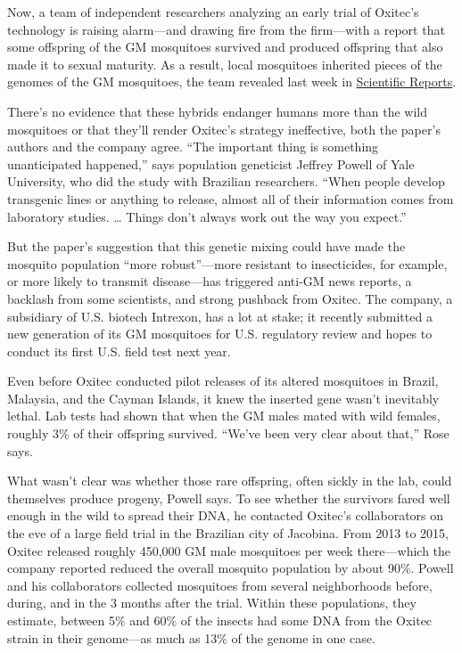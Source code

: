 \documentclass[
]{book}
\begin{document}
Now, a team of independent researchers analyzing an early trial of Oxitec's technology is raising alarm---and drawing fire from the firm---with a report that some offspring of the GM mosquitoes survived and produced offspring that also made it to sexual maturity. As a result, local mosquitoes inherited pieces of the genomes of the GM mosquitoes, the team revealed last week in \href{https://www.nature.com/articles/s41598-019-49660-6}{Scientific Reports}.

There's no evidence that these hybrids endanger humans more than the wild mosquitoes or that they'll render Oxitec's strategy ineffective, both the paper's authors and the company agree. ``The important thing is something unanticipated happened,'' says population geneticist Jeffrey Powell of Yale University, who did the study with Brazilian researchers. ``When people develop transgenic lines or anything to release, almost all of their information comes from laboratory studies. \ldots{} Things don't always work out the way you expect.''

But the paper's suggestion that this genetic mixing could have made the mosquito population ``more robust''---more resistant to insecticides, for example, or more likely to transmit disease---has triggered anti-GM news reports, a backlash from some scientists, and strong pushback from Oxitec. The company, a subsidiary of U.S. biotech Intrexon, has a lot at stake; it recently submitted a new generation of its GM mosquitoes for U.S. regulatory review and hopes to conduct its first U.S. field test next year.

Even before Oxitec conducted pilot releases of its altered mosquitoes in Brazil, Malaysia, and the Cayman Islands, it knew the inserted gene wasn't inevitably lethal. Lab tests had shown that when the GM males mated with wild females, roughly 3\% of their offspring survived. ``We've been very clear about that,'' Rose says.

What wasn't clear was whether those rare offspring, often sickly in the lab, could themselves produce progeny, Powell says. To see whether the survivors fared well enough in the wild to spread their DNA, he contacted Oxitec's collaborators on the eve of a large field trial in the Brazilian city of Jacobina. From 2013 to 2015, Oxitec released roughly 450,000 GM male mosquitoes per week there---which the company reported reduced the overall mosquito population by about 90\%. Powell and his collaborators collected mosquitoes from several neighborhoods before, during, and in the 3 months after the trial. Within these populations, they estimate, between 5\% and 60\% of the insects had some DNA from the Oxitec strain in their genome---as much as 13\% of the genome in one case.
\end{document}

